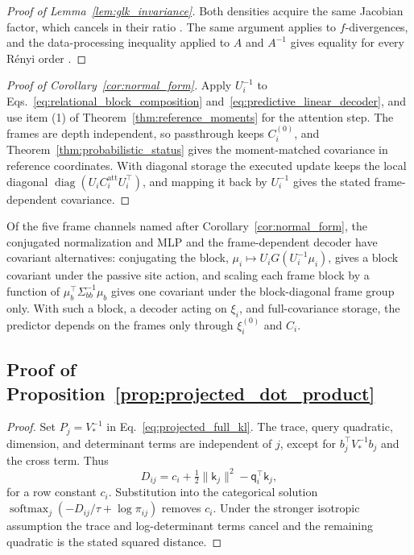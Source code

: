 \documentclass[twoside,11pt]{article}
\newcommand{\softmax}{\operatorname{softmax}}
\begin{document}
\begin{proof}[Proof of Lemma~\ref{lem:glk_invariance}]
Both densities acquire the same Jacobian factor, which cancels in their ratio \citep{Amari2016}. The same argument applies to $f$-divergences, and the data-processing inequality applied to $A$ and $A^{-1}$ gives equality for every R\'enyi order \citep[Thm.~9]{vanErvenHarremoes2014}.
\end{proof}

\begin{proof}[Proof of Corollary~\ref{cor:normal_form}]
Apply $U_i^{-1}$ to Eqs.~\eqref{eq:relational_block_composition} and~\eqref{eq:predictive_linear_decoder}, and use item (1) of Theorem~\ref{thm:reference_moments} for the attention step. The frames are depth independent, so passthrough keeps $C_i^{(0)}$, and Theorem~\ref{thm:probabilistic_status} gives the moment-matched covariance in reference coordinates. With diagonal storage the executed update keeps the local diagonal $\operatorname{diag}(U_iC_i^{\mathrm{att}}U_i^\top)$, and mapping it back by $U_i^{-1}$ gives the stated frame-dependent covariance.
\end{proof}
Of the five frame channels named after Corollary~\ref{cor:normal_form}, the conjugated normalization and MLP and the frame-dependent decoder have covariant alternatives: conjugating the block, $\mu_i\mapsto U_iG(U_i^{-1}\mu_i)$, gives a block covariant under the passive site action, and scaling each frame block by a function of $\mu_b^\top\Sigma_{bb}^{-1}\mu_b$ gives one covariant under the block-diagonal frame group only. With such a block, a decoder acting on $\xi_i$, and full-covariance storage, the predictor depends on the frames only through $\xi_i^{(0)}$ and $C_i$.

\subsection{Proof of Proposition~\ref{prop:projected_dot_product}}
\label{app:proof_projected_dot_product}

\begin{proof}
Set $P_j=V_*^{-1}$ in Eq.~\eqref{eq:projected_full_kl}. The trace, query quadratic, dimension, and determinant terms are independent of $j$, except for $b_j^\top V_*^{-1}b_j$ and the cross term. Thus
\begin{equation}
D_{ij}=c_i+\tfrac12\|\mathsf k_j\|^2
-\mathsf q_i^\top\mathsf k_j,
\label{eq:projected_kl_row_decomposition}
\end{equation}
for a row constant $c_i$. Substitution into the categorical solution $\softmax_j(-D_{ij}/\tau+\log\pi_{ij})$ removes $c_i$. Under the stronger isotropic assumption the trace and log-determinant terms cancel and the remaining quadratic is the stated squared distance.
\end{proof}
\end{document}
